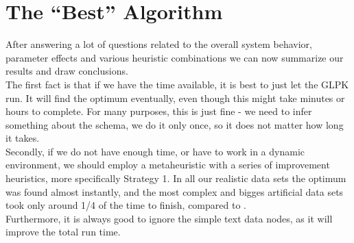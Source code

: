 \section{The ``Best'' Algorithm}

After answering a lot of questions related to the overall system behavior, parameter effects and various heuristic combinations we can now summarize our results and draw conclusions.\\

The first fact is that if we have the time available, it is best to just let the GLPK run. It will find the optimum eventually, even though this might take minutes or hours to complete. For many purposes, this is just fine - we need to infer something about the schema, we do it only once, so it does not matter how long it takes.\\

Secondly, if we do not have enough time, or have to work in a dynamic environment, we should employ a metaheuristic with a series of improvement heuristics, more specifically Strategy 1. In all our realistic data sets the optimum was found almost instantly, and the most complex and bigges artificial data sets took only around 1/4 of the time to finish, compared to .\\

Furthermore, it is always good to ignore the simple text data nodes, as it will improve the total run time.
